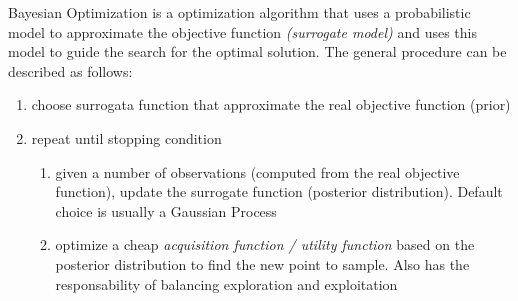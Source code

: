 Bayesian Optimization is a optimization algorithm that uses a probabilistic model to approximate the objective function \textit{(surrogate model)} and uses this model to guide the search for the optimal solution. The general procedure can be described as follows:
\begin{enumerate}
    \item choose surrogata function that approximate the real objective function (prior)
    \item repeat until stopping condition
          \begin{enumerate}
              \item given a number of observations (computed from the real objective function), update the surrogate function (posterior distribution). Default choice is usually a Gaussian Process
              \item optimize a cheap \textit{acquisition function / utility function} based on the posterior distribution to find the new point to sample. Also has the responsability of balancing exploration and exploitation
          \end{enumerate}
\end{enumerate}